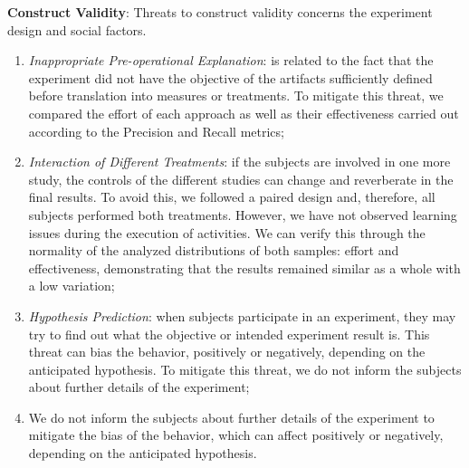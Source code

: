 \textbf{Construct Validity}: 
Threats to construct validity concerns the experiment design and social factors.
\begin{enumerate}[label=\roman*.]
    \item \textit{Inappropriate Pre-operational Explanation}: is related to the fact that the experiment did not have the objective of the artifacts sufficiently defined before translation into measures or treatments. To mitigate this threat, we compared the effort of each approach as well as their effectiveness carried out according to the Precision and Recall metrics; 
   
    \item \textit{Interaction of Different Treatments}: 
    if the subjects are involved in one more study, the controls of the different studies can change and reverberate in the final results.
    To avoid this, we followed a paired design and, therefore, all subjects performed both treatments.
    However, we have not observed learning issues during the execution of activities.
    We can verify this through the normality of the analyzed distributions of both samples: effort and effectiveness, demonstrating that the results remained similar as a whole with a low variation; 
    
    
    \item \textit{Hypothesis Prediction}: 
    when subjects participate in an experiment, they may try to find out what the objective or intended experiment result is. 
    This threat can bias the behavior, positively or negatively, depending on the anticipated hypothesis.
    To mitigate this threat, we do not inform the subjects about further details of the experiment; 
    
    \item We do not inform the subjects about further details of the experiment to mitigate the bias of the behavior, which can affect positively or negatively, depending on the anticipated hypothesis.
\end{enumerate}

